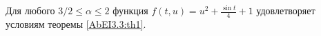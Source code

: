 \begin{lemma}\label{AbEI3.3:lemm}Для любого $3/2\le \alpha \le 2$ функция $f\left(t,u\right)=u^2+\frac{\sin t}{4}+1$ удовлетворяет условиям теоремы \ref{AbEI3.3:th1}.
\end{lemma}

%
%
%
%
%
%
